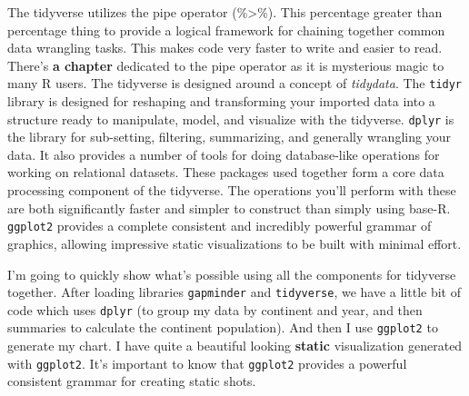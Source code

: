 \documentclass[
]{article}
\newenvironment{Shaded}{\begin{snugshade}}{\end{snugshade}}
\newcommand{\AttributeTok}[1]{\textcolor[rgb]{0.77,0.63,0.00}{#1}}
\newcommand{\FunctionTok}[1]{\textcolor[rgb]{0.00,0.00,0.00}{#1}}
\newcommand{\NormalTok}[1]{#1}
\newcommand{\SpecialCharTok}[1]{\textcolor[rgb]{0.00,0.00,0.00}{#1}}
\newcommand{\StringTok}[1]{\textcolor[rgb]{0.31,0.60,0.02}{#1}}
\begin{document}
The tidyverse utilizes the pipe operator (\%\textgreater\%). This percentage greater than percentage thing to provide a logical framework for chaining together common data wrangling tasks. This makes code very faster to write and easier to read. There's \textbf{a chapter} dedicated to the pipe operator as it is mysterious magic to many R users. The tidyverse is designed around a concept of \emph{tidydata}. The \texttt{tidyr} library is designed for reshaping and transforming your imported data into a structure ready to manipulate, model, and visualize with the tidyverse. \texttt{dplyr} is the library for sub-setting, filtering, summarizing, and generally wrangling your data. It also provides a number of tools for doing database-like operations for working on relational datasets. These packages used together form a core data processing component of the tidyverse. The operations you'll perform with these are both significantly faster and simpler to construct than simply using base-R. \texttt{ggplot2} provides a complete consistent and incredibly powerful grammar of graphics, allowing impressive static visualizations to be built with minimal effort.

I'm going to quickly show what's possible using all the components for tidyverse together. After loading libraries \texttt{gapminder} and \texttt{tidyverse}, we have a little bit of code which uses \texttt{dplyr} (to group my data by continent and year, and then summaries to calculate the continent population). And then I use \texttt{ggplot2} to generate my chart. I have quite a beautiful looking \textbf{static} visualization generated with \texttt{ggplot2}. It's important to know that \texttt{ggplot2} provides a powerful consistent grammar for creating static shots.

\begin{Shaded}
\end{Shaded}
\end{document}
